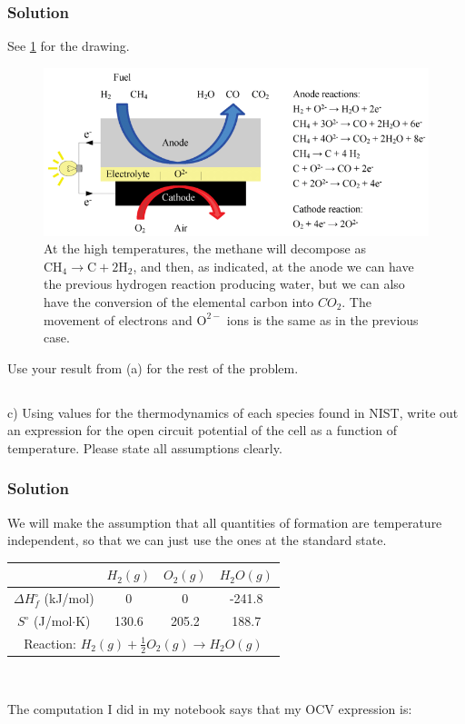 \documentclass[12pt]{article}
\begin{document}
\subsubsection{Solution}
See \ref{sofc_ch4} for the drawing.
\begin{figure}[h!]
    \centering
    \includegraphics[width=\textwidth]{SOFC_methane.png}
    \caption{At the high temperatures, the methane will decompose as $ \mathrm{CH}_{4} \rightarrow \mathrm{C} + 2 \mathrm{H}_{2}$, and then, as indicated, at the anode we can have the previous hydrogen reaction producing water, but we can also have the conversion of the elemental carbon into $CO_2$. The movement of electrons and $\mathrm{O}^{2-}$ ions is the same as in the previous case.}
\label{sofc_ch4}
\end{figure}

Use your result from (a) for the rest of the problem.\\
\subsection{}
c) Using values for the thermodynamics of each species found in NIST, write out an expression for the open circuit potential of the cell as a function of temperature. Please state all assumptions clearly.\\
\subsubsection{Solution}
We will make the assumption that all quantities of formation are temperature independent, so that we can just use the ones at the standard state.
\begin{center}
\begin{tabular}{|c|c|c|c|}
\hline
 & $H_{2}(g)$ & $O_{2}(g)$ & $H_{2}O(g)$ \\
\hline
$\Delta H_{f}^{\circ}$ (kJ/mol) & 0 & 0 & -241.8 \\
\hline
$S^{\circ}$ (J/mol$\cdot$K) & 130.6 & 205.2 & 188.7 \\
\hline
\multicolumn{4}{|c|}{Reaction: $H_{2}(g) + \frac{1}{2} O_{2}(g) \rightarrow H_{2}O(g)$} \\
\hline
\end{tabular}\\
\end{center}
The computation I did in my notebook says that my OCV expression is:
\end{document}
